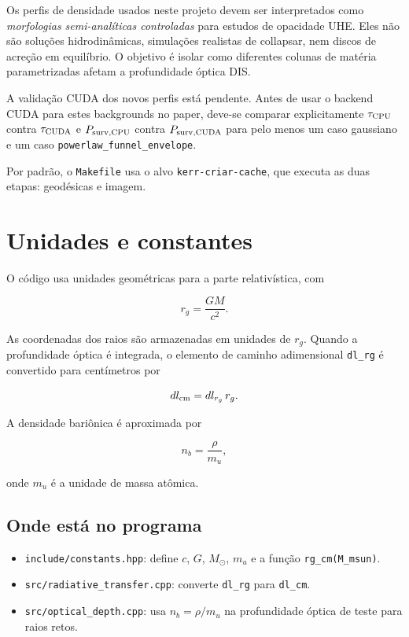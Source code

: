 \documentclass[11pt,a4paper]{article}
\begin{document}
Os perfis de densidade usados neste projeto devem ser interpretados como
\emph{morfologias semi-analíticas controladas} para estudos de opacidade UHE.
Eles não são soluções hidrodinâmicas, simulações realistas de collapsar, nem
discos de acreção em equilíbrio. O objetivo é isolar como diferentes colunas de
matéria parametrizadas afetam a profundidade óptica DIS.

A validação CUDA dos novos perfis está pendente. Antes de usar o backend CUDA
para estes backgrounds no paper, deve-se comparar explicitamente
$\tau_{\rm CPU}$ contra $\tau_{\rm CUDA}$ e $P_{\rm surv,CPU}$ contra
$P_{\rm surv,CUDA}$ para pelo menos um caso gaussiano e um caso
\texttt{powerlaw\_funnel\_envelope}.

Por padrão, o \texttt{Makefile} usa o alvo \texttt{kerr-criar-cache}, que
executa as duas etapas: geodésicas e imagem.

\section{Unidades e constantes}

O código usa unidades geométricas para a parte relativística, com

\begin{equation}
  r_g = \frac{GM}{c^2}.
\end{equation}

As coordenadas dos raios são armazenadas em unidades de $r_g$. Quando a
profundidade óptica é integrada, o elemento de caminho adimensional
\texttt{dl\_rg} é convertido para centímetros por

\begin{equation}
  dl_{\rm cm} = dl_{r_g}\,r_g.
\end{equation}

A densidade bariônica é aproximada por

\begin{equation}
  n_b = \frac{\rho}{m_u},
\end{equation}

onde $m_u$ é a unidade de massa atômica.

\subsection*{Onde está no programa}

\begin{itemize}
  \item \texttt{include/constants.hpp}: define $c$, $G$, $M_\odot$, $m_u$ e
  a função \texttt{rg\_cm(M\_msun)}.
  \item \texttt{src/radiative\_transfer.cpp}: converte \texttt{dl\_rg} para
  \texttt{dl\_cm}.
  \item \texttt{src/optical\_depth.cpp}: usa $n_b=\rho/m_u$ na profundidade
  óptica de teste para raios retos.
\end{itemize}
\end{document}
